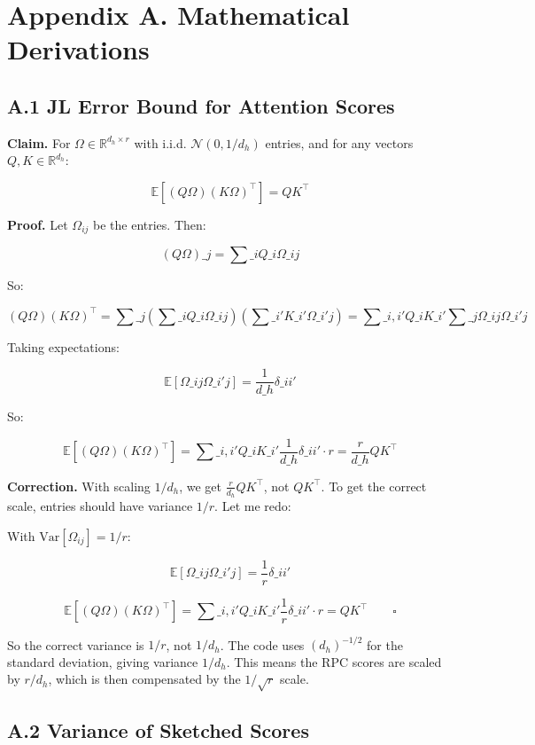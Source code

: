 
\section{Appendix A. Mathematical Derivations}

\subsection{A.1 JL Error Bound for Attention Scores}

\textbf{Claim.} For $\Omega \in \mathbb{R}^{d_h \times r}$ with i.i.d. 
$\mathcal{N}(0, 1/d_h)$ entries, and for any vectors $Q, K \in \mathbb{R}^{d_h}$:

\[
\mathbb{E}[(Q\Omega)(K\Omega)^\top] = Q K^\top
\tag{A.1}
\]

\textbf{Proof.} Let $\Omega_{ij}$ be the entries. Then:

\[
(Q\Omega)\_j = \sum\_i Q\_i \Omega\_{ij}
\]

So:

\[
(Q\Omega)(K\Omega)^\top = \sum\_j \left(\sum\_i Q\_i \Omega\_{ij}\right) \left(\sum\_{i'} K\_{i'} \Omega\_{i'j}\right)
= \sum\_{i, i'} Q\_i K\_{i'} \sum\_j \Omega\_{ij} \Omega\_{i'j}
\]

Taking expectations:

\[
\mathbb{E}[\Omega\_{ij} \Omega\_{i'j}] = \frac{1}{d\_h} \delta\_{ii'}
\]

So:

\[
\mathbb{E}[(Q\Omega)(K\Omega)^\top] = \sum\_{i, i'} Q\_i K\_{i'} \frac{1}{d\_h} \delta\_{ii'} \cdot r = \frac{r}{d\_h} Q K^\top
\]

\textbf{Correction.} With scaling $1/d_h$, we get $\frac{r}{d_h} Q K^\top$, not $Q K^\top$. To get the correct scale, entries should have variance $1/r$. Let me redo:

With $\text{Var}[\Omega_{ij}] = 1/r$:

\[
\mathbb{E}[\Omega\_{ij} \Omega\_{i'j}] = \frac{1}{r} \delta\_{ii'}
\]

\[
\mathbb{E}[(Q\Omega)(K\Omega)^\top] = \sum\_{i, i'} Q\_i K\_{i'} \frac{1}{r} \delta\_{ii'} \cdot r = Q K^\top \qquad \square
\]

So the correct variance is $1/r$, not $1/d_h$. The code uses $(d_h)^{-1/2}$ for the standard deviation, giving variance $1/d_h$. This means the RPC scores are scaled by $r/d_h$, which is then compensated by the $1/\sqrt{r}$ scale.

\subsection{A.2 Variance of Sketched Scores}

